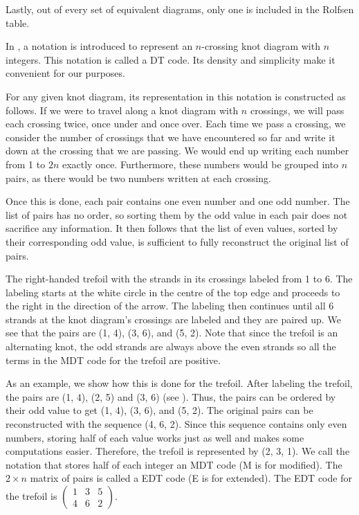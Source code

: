 \begin{paper}
Lastly, out of every set of equivalent diagrams, only one is included in the
Rolfsen table.


In \cite{htw}, a notation is introduced to represent an $n$-crossing knot
diagram with $n$ integers.
This notation is called a DT code.
Its density and simplicity make it convenient for our purposes.

For any given knot diagram, its representation in this notation is constructed
as follows.
If we were to travel along a knot diagram with $n$ crossings, we will pass each
crossing twice, once under and once over.
Each time we pass a crossing, we consider the number of crossings that we
have encountered so far and write it down at the crossing that we are passing.
We would end up writing each number from 1 to $2n$ exactly once.
Furthermore, these numbers would be grouped into $n$ pairs, as there would be
two numbers written at each crossing.

Once this is done, each pair contains one even number and one odd number.
The list of pairs has no order, so sorting them by the odd value in each pair
does not sacrifice any information.
It then follows that the list of even values, sorted by their corresponding odd
value, is sufficient to fully reconstruct the original list of pairs.\\

{\begin{center}\end{center}}
{The right-handed trefoil with the strands in its crossings labeled from 1 to 6.
The labeling starts at the white circle in the centre of the top edge and
proceeds to the right in the direction of the arrow.
The labeling then continues until all 6 strands at the knot diagram's crossings
are labeled and they are paired up.
We see that the pairs are (1, 4), (3, 6), and (5, 2).
Note that since the trefoil is an alternating knot, the odd strands are always
above the even strands so all the terms in the MDT code for the trefoil are
positive.}

As an example, we show how this is done for the trefoil.
After labeling the trefoil, the pairs are (1, 4), (2, 5) and (3, 6) (see
\figLabeled).
Thus, the pairs can be ordered by their odd value to get (1, 4), (3, 6), and
(5, 2).
The original pairs can be reconstructed with the sequence (4, 6, 2).
Since this sequence contains only even numbers, storing half of each value works
just as well and makes some computations easier.
Therefore, the trefoil is represented by (2, 3, 1).
We call the notation that stores half of each integer an MDT code (M is for
modified).
The $2\times n$ matrix of pairs is called a EDT code (E is for extended).
The EDT code for the trefoil is $\begin{pmatrix}1&3&5\\4&6&2\end{pmatrix}$.\\


\end{paper}
